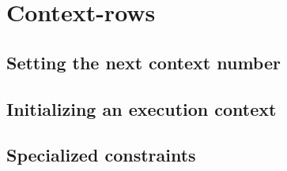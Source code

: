 \section{Context-rows}
\subsection{Setting the next context number \lispDone{}}      \label{hub: context-rows: context constraints}         
\subsection{Initializing an execution context \lispDone{}}    \label{hub: context-rows: initialize context}          
\subsection{Specialized constraints \lispDone{}}              \label{hub: context-rows: specialized constraints}     
